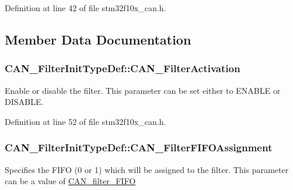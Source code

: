 Definition at line 42 of file stm32f10x\+\_\+can.\+h.



\subsection{Member Data Documentation}
\subsubsection[{\texorpdfstring{C\+A\+N\+\_\+\+Filter\+Activation}{CAN_FilterActivation}}]{ C\+A\+N\+\_\+\+Filter\+Init\+Type\+Def\+::\+C\+A\+N\+\_\+\+Filter\+Activation}\hypertarget{struct_c_a_n___filter_init_type_def_a0225afda33b565f358ca75bdaa780074}{}\label{struct_c_a_n___filter_init_type_def_a0225afda33b565f358ca75bdaa780074}
Enable or disable the filter. This parameter can be set either to E\+N\+A\+B\+LE or D\+I\+S\+A\+B\+LE. 

Definition at line 52 of file stm32f10x\+\_\+can.\+h.

\subsubsection[{\texorpdfstring{C\+A\+N\+\_\+\+Filter\+F\+I\+F\+O\+Assignment}{CAN_FilterFIFOAssignment}}]{ C\+A\+N\+\_\+\+Filter\+Init\+Type\+Def\+::\+C\+A\+N\+\_\+\+Filter\+F\+I\+F\+O\+Assignment}\hypertarget{struct_c_a_n___filter_init_type_def_aa7da4664b11680b76d7af06d3fa78f14}{}\label{struct_c_a_n___filter_init_type_def_aa7da4664b11680b76d7af06d3fa78f14}
Specifies the F\+I\+FO (0 or 1) which will be assigned to the filter. This parameter can be a value of \hyperlink{group___c_a_n__filter___f_i_f_o}{C\+A\+N\+\_\+filter\+\_\+\+F\+I\+FO} 

